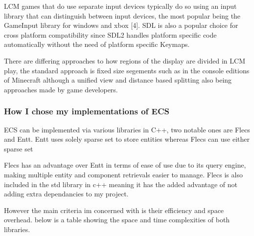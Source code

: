\documentclass[]{final_report}
\begin{document}
LCM games that do use separate input devices typically do so using an input library that can distinguish between input devices, the most popular being the GameInput library for windows and xbox [4]. SDL is also a popular choice for cross platform compatibility since SDL2 handles platform specific code automatically without the need of platform specific Keymaps. \newline

There are differing approaches to how regions of the display are divided in LCM play, the standard approach is fixed size segements such as in the console editions of Minecraft although a unified view and distance based splitting also being approaches made by game developers. \newline


\subsubsection{How I chose my implementations of ECS}
ECS can be implemented via various libraries in C++, two notable ones are Flecs and Entt. Entt uses solely sparse set to store entities whereas Flecs can use either sparse set 

Flecs has an advantage over Entt in terms of ease of use due to its query engine, making multiple entity and component retrievals easier to manage. Flecs is also included in the std library in c++ meaning it has the added advantage of not adding extra dependancies to my project.

However the main criteria im concerned with is their efficiency and space overhead. below is a table showing the space and time complexities of both libraries.
\end{document}
